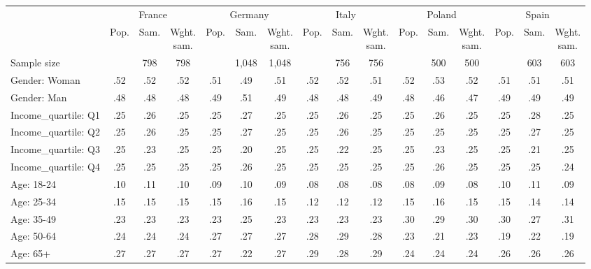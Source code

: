 
\begin{tabular}[t]{lccccccccccccccc}
\toprule
\multicolumn{1}{c}{} & \multicolumn{3}{c}{France} & \multicolumn{3}{c}{Germany} & \multicolumn{3}{c}{Italy} & \multicolumn{3}{c}{Poland} & \multicolumn{3}{c}{Spain} \\
\cmidrule(l{3pt}r{3pt}){2-4} \cmidrule(l{3pt}r{3pt}){5-7} \cmidrule(l{3pt}r{3pt}){8-10} \cmidrule(l{3pt}r{3pt}){11-13} \cmidrule(l{3pt}r{3pt}){14-16}
  & Pop. & Sam. & \makecell{Wght.\\sam.} & Pop. & Sam. & \makecell{Wght.\\sam.} & Pop. & Sam. & \makecell{Wght.\\sam.} & Pop. & Sam. & \makecell{Wght.\\sam.} & Pop. & Sam. & \makecell{Wght.\\sam.}\\
\midrule
Sample size &  & 798 & 798 &  & 1,048 & 1,048 &  & 756 & 756 &  & 500 & 500 &  & 603 & 603\\
\addlinespace
Gender: Woman & .52 & .52 & .52 & .51 & .49 & .51 & .52 & .52 & .51 & .52 & .53 & .52 & .51 & .51 & .51\\
Gender: Man & .48 & .48 & .48 & .49 & .51 & .49 & .48 & .48 & .49 & .48 & .46 & .47 & .49 & .49 & .49\\
\addlinespace
Income\_quartile: Q1 & .25 & .26 & .25 & .25 & .27 & .25 & .25 & .26 & .25 & .25 & .26 & .25 & .25 & .28 & .25\\
Income\_quartile: Q2 & .25 & .26 & .25 & .25 & .27 & .25 & .25 & .26 & .25 & .25 & .25 & .25 & .25 & .27 & .25\\
Income\_quartile: Q3 & .25 & .23 & .25 & .25 & .20 & .25 & .25 & .22 & .25 & .25 & .23 & .25 & .25 & .21 & .25\\
Income\_quartile: Q4 & .25 & .25 & .25 & .25 & .26 & .25 & .25 & .25 & .25 & .25 & .26 & .25 & .25 & .25 & .24\\
\addlinespace
Age: 18-24 & .10 & .11 & .10 & .09 & .10 & .09 & .08 & .08 & .08 & .08 & .09 & .08 & .10 & .11 & .09\\
Age: 25-34 & .15 & .15 & .15 & .15 & .16 & .15 & .12 & .12 & .12 & .15 & .16 & .15 & .15 & .14 & .14\\
Age: 35-49 & .23 & .23 & .23 & .23 & .25 & .23 & .23 & .23 & .23 & .30 & .29 & .30 & .30 & .27 & .31\\
Age: 50-64 & .24 & .24 & .24 & .27 & .27 & .27 & .28 & .29 & .28 & .23 & .21 & .23 & .19 & .22 & .19\\
Age: 65+ & .27 & .27 & .27 & .27 & .22 & .27 & .29 & .28 & .29 & .24 & .24 & .24 & .26 & .26 & .26\\

\end{tabular}
